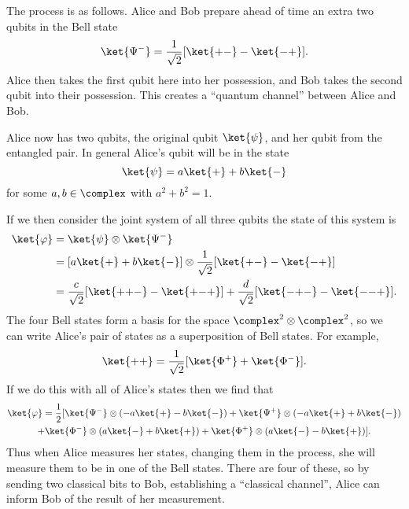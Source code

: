 \documentclass[fleqn]{NotesClass}
\begin{document}
    The process is as follows.
    Alice and Bob prepare ahead of time an extra two qubits in the Bell state
    \begin{equation}
        \ket{\Psi^-} = \frac{1}{\sqrt{2}}[\ket{{+}{-}} - \ket{{-}{+}}].
    \end{equation}
    Alice then takes the first qubit here into her possession, and Bob takes the second qubit into their possession.
    This creates a \enquote{quantum channel} between Alice and Bob.
    
    Alice now has two qubits, the original qubit \(\ket{\psi}\), and her qubit from the entangled pair.
    In general Alice's qubit will be in the state
    \begin{equation}
        \ket{\psi} = a\ket{+} + b\ket{-}
    \end{equation}
    for some \(a, b \in \complex\) with \(a^2 + b^2 = 1\).
    
    If we then consider the joint system of all three qubits the state of this system is
    \begin{align}
        \ket{\varphi} &= \ket{\psi} \otimes \ket{\Psi^-}\\
        &= [a\ket{+} + b\ket{-}] \otimes \frac{1}{\sqrt{2}}[\ket{+-} - \ket{-+}]\\
        &= \frac{c}{\sqrt{2}}[\ket{{+}{+}{-}} - \ket{{+}{-}{+}}] + \frac{d}{\sqrt{2}}[\ket{{-}{+}{-}} - \ket{{-}{-}{+}}].
    \end{align}
    The four Bell states form a basis for the space \(\complex^2 \otimes \complex^2\), so we can write Alice's pair of states as a superposition of Bell states.
    For example,
    \begin{equation}
        \ket{{+}{+}} = \frac{1}{\sqrt{2}}[\ket{\Phi^+} + \ket{\Phi^-}].
    \end{equation}
    If we do this with all of Alice's states then we find that
    \begin{multline}
        \ket{\varphi} = \frac{1}{2}[\ket{\Psi^-}\otimes (-a\ket{+} - b\ket{-}) + \ket{\Psi^+}\otimes (-a\ket{+} + b\ket{-})\\
        + \ket{\Phi^-}\otimes (a\ket{-} + b\ket{+}) + \ket{\Phi^+}\otimes (a\ket{-} - b\ket{+})].
    \end{multline}
    Thus when Alice measures her states, changing them in the process, she will measure them to be in one of the Bell states.
    There are four of these, so by sending two classical bits to Bob, establishing a \enquote{classical channel}, Alice can inform Bob of the result of her measurement.
    
\end{document}
